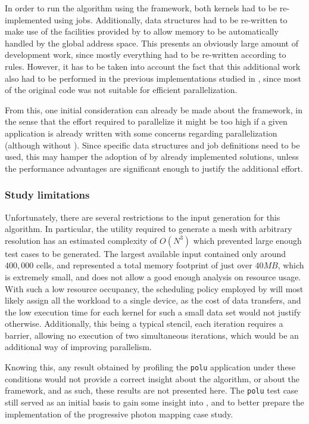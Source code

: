\documentclass[main.tex]{subfiles}
\begin{document}
In order to run the algorithm using the framework, both kernels had to be re-implemented using \gama jobs. Additionally, data structures had to be re-written to make use of the facilities provided by \gama to allow memory to be automatically handled by the global address space.
This presents an obviously large amount of development work, since mostly everything had to be re-written according to \gama rules. However, it has to be taken into account the fact that this additional work also had to be performed in the previous implementations studied in \cite{naps2012}, since most of the original code was not suitable for efficient parallelization.

From this, one initial consideration can already be made about the framework, in the sense that the effort required to parallelize it might be too high if a given application is already written with some concerns regarding parallelization (although without \gama). Since specific data structures and job definitions need to be used, this may hamper the adoption of \gama by already implemented solutions, unless the performance advantages are significant enough to justify the additional effort.


\subsubsection{Study limitations}

Unfortunately, there are several restrictions to the input generation for this algorithm. In particular, the utility required to generate a mesh with arbitrary resolution has an estimated complexity of $O(N^3)$ which prevented large enough test cases to be generated. The largest available input contained only around $400,000$ cells, and represented a total memory footprint of just over $40MB$, which is extremely small, and does not allow a good enough analysis on resource usage. With such a low resource occupancy, the scheduling policy employed by \gama will most likely assign all the workload to a single device, as the cost of data transfers, and the low execution time for each kernel for such a small data set would not justify otherwise. Additionally, this being a typical stencil, each iteration requires a barrier, allowing no execution of two simultaneous iterations, which would be an additional way of improving parallelism.

Knowing this, any result obtained by profiling the \texttt{polu} application under these conditions would not provide a correct insight about the algorithm, or about the framework, and as such, these results are not presented here.
The \texttt{polu} test case still served as an initial basis to gain some insight into \gama, and to better prepare the implementation of the progressive photon mapping case study.
\end{document}
